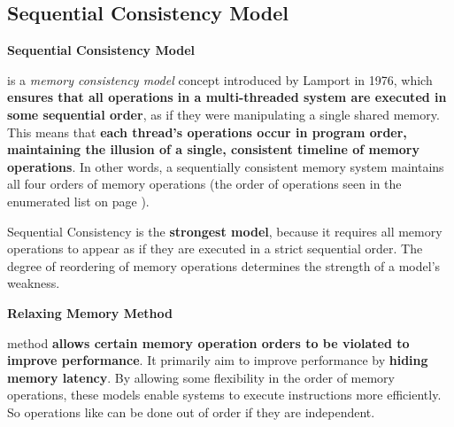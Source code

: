 \subsection{Sequential Consistency Model}

\begin{flushleft}
    \textcolor{Green3}{ \textbf{Sequential Consistency Model}}
\end{flushleft}
 is a \emph{memory consistency model} concept introduced by Lamport in 1976, which \textbf{ensures that all operations in a multi-threaded system are executed in some sequential order}, as if they were manipulating a single shared memory. This means that \textbf{each thread's operations occur in program order, maintaining the illusion of a single, consistent timeline of memory operations}. In other words, a sequentially consistent memory system maintains all four orders of memory operations (the order of operations seen in the enumerated list on page ).

\highspace
Sequential Consistency is the \textbf{strongest model}, because it requires all memory operations to appear as if they are executed in a strict sequential order. The degree of reordering of memory operations determines the strength of a model's weakness.

\highspace
\begin{flushleft}
    \textcolor{Green3}{ \textbf{Relaxing Memory Method}}
\end{flushleft}
 method \textbf{allows certain memory operation orders to be violated to improve performance}. It primarily aim to improve performance by \textbf{hiding memory latency}. By allowing some flexibility in the order of memory operations, these models enable systems to execute instructions more efficiently. So operations like  can be done out of order if they are independent.

